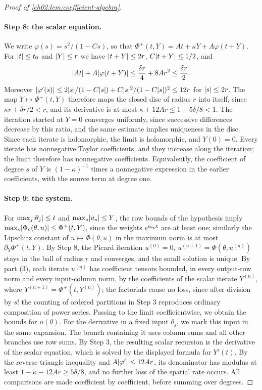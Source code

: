 \begin{proof}[Proof of \cref{ch02:lem:coefficient-algebra}]
\paragraph{Step 8: the scalar equation.} We write $\varphi(s)=s^2/(1-Cs)$, so that $\Phi^+(t,Y)=At+\kappa Y+A\varphi(t+Y)$. For $\lvert t\rvert\le t_0$ and $\lvert Y\rvert\le r$ we have $\lvert t+Y\rvert\le2r$, $C\lvert t+Y\rvert\le1/2$, and
\[
 \lvert At\rvert+A\lvert \varphi(t+Y)\rvert\le\frac{\delta r}4+8Ar^2\le\frac{\delta r}2.
\]
Moreover $\lvert \varphi'(s)\rvert\le2\lvert s\rvert/(1-C\lvert s\rvert)+C\lvert s\rvert^2/(1-C\lvert s\rvert)^2\le12r$ for $\lvert s\rvert\le2r$. The map $Y\mapsto\Phi^+(t,Y)$ therefore maps the closed disc of radius $r$ into itself, since $\kappa r+\delta r/2<r$, and its derivative is at most $\kappa+12Ar\le1-5\delta/8<1$. The iteration started at $Y=0$ converges uniformly, since successive differences decrease by this ratio, and the same estimate implies uniqueness in the disc. Since each iterate is holomorphic, the limit is holomorphic, and $Y(0)=0$. Every iterate has nonnegative Taylor coefficients, and they increase along the iteration; the limit therefore has nonnegative coefficients. Equivalently, the coefficient of degree $s$ of $Y$ is $(1-\kappa)^{-1}$ times a nonnegative expression in the earlier coefficients, with the source term at degree one.

\paragraph{Step 9: the system.} For $\max_j\lvert \theta_j\rvert\le t$ and $\max_o\lvert u_o\rvert\le Y$, the row bounds of the hypothesis imply $\max_o\lvert \Phi_o(\theta,u)\rvert\le\Phi^+(t,Y)$, since the weights $e^{a_{\mathrm{sp}}\mathsf t}$ are at least one; similarly the Lipschitz constant of $u\mapsto\Phi(\theta,u)$ in the maximum norm is at most $\partial_Y\Phi^+(t,Y)$. By Step 8, the Picard iteration $u^{(0)}=0$, $u^{(n+1)}=\Phi(\theta,u^{(n)})$ stays in the ball of radius $r$ and converges, and the small solution is unique. By part (3), each iterate $u^{(n)}$ has coefficient tensors bounded, in every output-row norm and every input-column norm, by the coefficients of the scalar iterate $Y^{(n)}$, where $Y^{(n+1)}=\Phi^+(t,Y^{(n)})$; the factorials cause no loss, since after division by $s!$ the counting of ordered partitions in Step 3 reproduces ordinary composition of power series. Passing to the limit coefficientwise, we obtain the bounds for $u(\theta)$. For the derivative in a fixed input $\theta_j$, we mark this input in the same expansion. The branch containing it uses column sums and all other branches use row sums. By Step 3, the resulting scalar recursion is the derivative of the scalar equation, which is solved by the displayed formula for $Y'(t)$. By the reverse triangle inequality and $A\lvert \varphi'\rvert\le12Ar$, its denominator has modulus at least $1-\kappa-12Ar\ge5\delta/8$, and no further loss of the spatial rate occurs. All comparisons are made coefficient by coefficient, before summing over degrees.


\end{proof}
